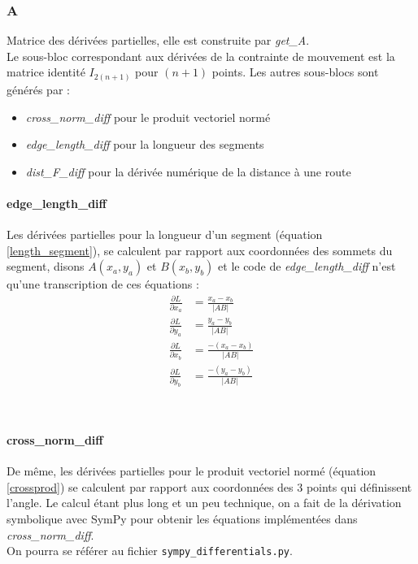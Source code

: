 \documentclass[11pt]{article}
\begin{document}
\subsubsection*{A}
Matrice des dérivées partielles, elle est construite par \textit{get\_A}.\\
Le sous-bloc correspondant aux dérivées de la contrainte de mouvement est la matrice identité $I_{2(n+1)}$ pour $(n+1)$ points. Les autres sous-blocs sont générés par :

\begin{itemize}
	\item \textit{cross\_norm\_diff} pour le produit vectoriel normé
	\item  \textit{edge\_length\_diff} pour la longueur des segments
	\item \textit{dist\_F\_diff} pour la dérivée numérique de la distance à une route
\end{itemize}




\paragraph{edge\_length\_diff}
Les dérivées partielles pour la longueur d'un segment (équation \eqref{length_segment}), se calculent par rapport aux coordonnées des sommets du segment, disons $A(x_a, y_a)$ et $B(x_b, y_b)$ et le code de \textit{edge\_length\_diff} n'est qu'une transcription de ces équations :
\begin{align*}
\frac{\partial L}{\partial x_a} &= \frac{x_a - x_b}{ \lvert AB \rvert }\\
\frac{\partial L}{\partial y_a} &= \frac{y_a - y_b}{ \lvert AB \rvert }\\
\frac{\partial L}{\partial x_b} &= \frac{-(x_a - x_b)}{ \lvert AB \rvert }\\
\frac{\partial L}{\partial y_b} &= \frac{-(y_a - y_b)}{ \lvert AB \rvert }
\end{align*}

\
\paragraph{cross\_norm\_diff}
De même, les dérivées partielles pour le produit vectoriel normé (équation \eqref{crossprod}) se calculent par rapport aux coordonnées des 3 points qui définissent l'angle. Le calcul étant plus long et un peu technique, on a fait de la dérivation symbolique avec SymPy pour obtenir les équations implémentées dans \textit{cross\_norm\_diff}.\\
On pourra se référer au fichier \verb|sympy_differentials.py|.
\end{document}

